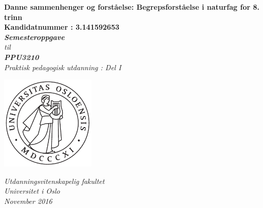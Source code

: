 \documentclass[main.tex]{subfiles}
\begin{document}
\thispagestyle{empty}
\begin{center}        %
  \vspace{5mm}          %
  \LARGE
  \textbf{Danne sammenhenger og forståelse: Begrepsforståelse i naturfag for 8. trinn} \\
  \Large
  \vspace{10mm}
  \large
  \textbf{Kandidatnummer : 3.141592653} \\
  \vspace{20mm}
  \Large
  {\bf{\textsl{Semesteroppgave}}} \\
  \textsl{til} \\
  \vspace{2mm}
  {\bf{\textsl{PPU3210}}} \\
  \vspace{5mm}
  {\large \textsl {Praktisk pedagogisk utdanning : Del I}}\\
  \vspace{10mm}
  \centerline{\includegraphics[width=45mm,height=45mm]{../figures/uiosegl.pdf}} 
  \vspace{8mm}
  \textsl{Utdanningsvitenskapelig fakultet} \\
  \textsl{Universitet i Oslo} \\
  \vspace{5mm}
  \large
  \textsl{November 2016} \\
  \vspace{2cm}


\end{center}
\end{document}
